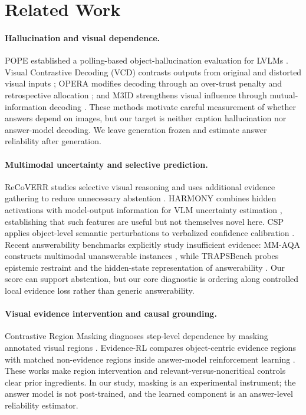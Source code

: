 \section{Related Work}
\label{sec:related}

\paragraph{Hallucination and visual dependence.}
POPE established a polling-based object-hallucination evaluation for LVLMs \citep{li2023pope}. Visual Contrastive Decoding (VCD) contrasts outputs from original and distorted visual inputs \citep{leng2023vcd}; OPERA modifies decoding through an over-trust penalty and retrospective allocation \citep{huang2023opera}; and M3ID strengthens visual influence through mutual-information decoding \citep{favero2024m3id}. These methods motivate careful measurement of whether answers depend on images, but our target is neither caption hallucination nor answer-model decoding. We leave generation frozen and estimate answer reliability after generation.

\paragraph{Multimodal uncertainty and selective prediction.}
ReCoVERR studies selective visual reasoning and uses additional evidence gathering to reduce unnecessary abstention \citep{srinivasan2024recoverr}. HARMONY combines hidden activations with model-output information for VLM uncertainty estimation \citep{mushtaq2025harmony}, establishing that such features are useful but not themselves novel here. CSP applies object-level semantic perturbations to verbalized confidence calibration \citep{zhao2025csp}. Recent answerability benchmarks explicitly study insufficient evidence: MM-AQA constructs multimodal unanswerable instances \citep{madhusudhan2026mmaqa}, while TRAPSBench probes epistemic restraint and the hidden-state representation of answerability \citep{pramono2026trapsbench}. Our score can support abstention, but our core diagnostic is ordering along controlled local evidence loss rather than generic answerability.

\paragraph{Visual evidence intervention and causal grounding.}
Contrastive Region Masking diagnoses step-level dependence by masking annotated visual regions \citep{chaturvedi2025crm}. Evidence-RL compares object-centric evidence regions with matched non-evidence regions inside answer-model reinforcement learning \citep{huang2026evidencerl}. These works make region intervention and relevant-versus-noncritical controls clear prior ingredients. In our study, masking is an experimental instrument; the answer model is not post-trained, and the learned component is an answer-level reliability estimator.

